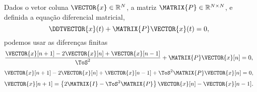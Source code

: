 \begin{myproofT}\label{proof:theo:differential-eq-discreto:order2:0}
Dados o vetor coluna $\VECTOR{x} \in \mathbb{R}^N$, a matriz $\MATRIX{P} \in \mathbb{R}^{N\times N}$, 
e definida a equação diferencial matricial,
\begin{equation}
\DDTVECTOR{x}(t) + \MATRIX{P} \VECTOR{x}(t)=0,
\end{equation}
podemos usar as diferenças finitas
\begin{equation}
\frac{\VECTOR{x}[n+1]-2\VECTOR{x}[n]+ \VECTOR{x}[n-1]}{\ToS^2} + \MATRIX{P} \VECTOR{x}[n]=0,
\end{equation}
\begin{equation}
\VECTOR{x}[n+1]-2\VECTOR{x}[n]+ \VECTOR{x}[n-1]  + \ToS^2 \MATRIX{P} \VECTOR{x}[n]=0,
\end{equation}
\begin{equation}
\VECTOR{x}[n+1]  =\left\{2\MATRIX{I}- \ToS^2 \MATRIX{P} \right\}\VECTOR{x}[n] - \VECTOR{x}[n-1].
\end{equation}
\end{myproofT}

